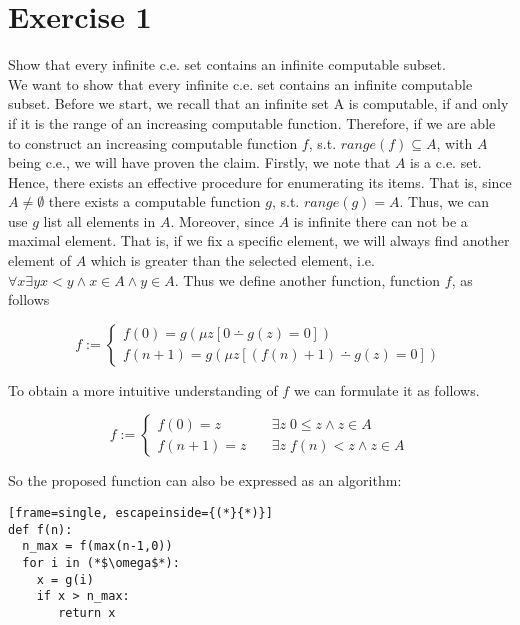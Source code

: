 \documentclass[11pt,a4paper]{article}
\begin{document}

\section*{Exercise 1}
Show that every infinite c.e. set contains an infinite computable subset. \\

We want to show that every infinite c.e. set contains an infinite computable subset.
Before we start, we recall that an infinite set A is computable, if and only if it is the range of an increasing computable function.
Therefore, if we are able to construct an increasing computable function $f$, s.t. $range(f) \subseteq A$, with $A$ being c.e., 
we will have proven the claim.
Firstly, we note that $A$ is a c.e. set. Hence, there exists an effective procedure for enumerating its items. 
That is, since $A \neq \emptyset$ there exists a computable function $g$, s.t. $range(g) = A$.
Thus, we can use $g$ list all elements in $A$. Moreover, since $A$ is infinite there can not be a maximal
element. That is, if we fix a specific element, we will always find another element of $A$ which is greater than the selected element, i.e. $\forall x \exists y x<y \wedge  x \in A \wedge y  \in A$.
Thus we define another function, function $f$, as follows


\begin{equation*}
f := 
\begin{cases}
f(0) = g(\mu z [0 \dotminus g(z)=0]) \\
f(n+1) = g(\mu z [(f(n)+1) \dotminus g(z) = 0])
\end{cases}
\end{equation*}

To obtain a more intuitive understanding of $f$ we can formulate it as follows.

\begin{equation*}
f := 
\begin{cases}
f(0) = z  & \quad \exists z\; 0 \leq z \wedge  z \in A \\
f(n+1) = z & \quad \exists z \; f(n) < z \wedge  z \in A
\end{cases}
\end{equation*}

So the proposed function can also be expressed as an algorithm:


\begin{lstlisting}[frame=single, escapeinside={(*}{*)}] 
def f(n):
  n_max = f(max(n-1,0))
  for i in (*$\omega$*):
  	x = g(i)
    if x > n_max:
       return x
\end{lstlisting}
\end{document}
